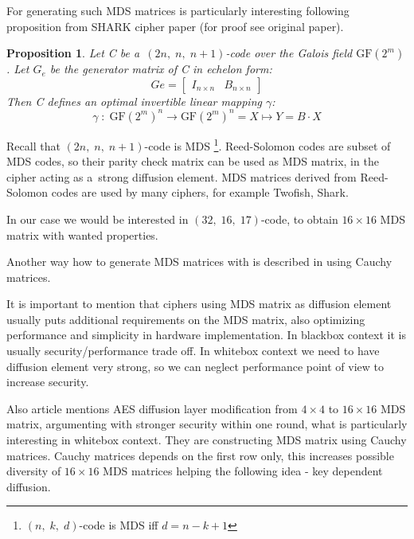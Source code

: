 \documentclass[11pt,oneside,final]{fithesis2}
\newtheorem{myprop}{Proposition}
\begin{document}
    For generating such MDS matrices is particularly interesting following proposition from SHARK cipher paper \citep{shark96} (for proof see
    original paper).
    
    \begin{myprop}
	Let C be a~$(2n,\; n,\; n+1)$-code over the Galois field $\text{GF}(2^m)$. Let $G_e$  be the generator matrix of C in echelon form:
	\begin{equation}
	   Ge = \begin{bmatrix} I_{n \times n} & B_{n \times n}\end{bmatrix}
	\end{equation}
	Then C defines an optimal invertible linear mapping $\gamma$:
	\begin{equation}
	   \gamma \; : \; \text{GF}(2^m)^n \rightarrow \text{GF}(2^m)^n = X \mapsto Y = B \cdot X
	\end{equation}
    \end{myprop}
    
    Recall that $(2n,\; n,\; n+1)$-code is MDS \footnote{$(n,\;k,\;d)$-code is MDS iff $d=n-k+1$}. Reed-Solomon codes are subset of MDS codes, so their 
    parity check matrix can be used as MDS matrix, in the cipher acting as a~strong diffusion element. MDS matrices derived from Reed-Solomon codes are used by many 
    ciphers, for example Twofish, Shark. 

    In our case we would be interested in $(32,\;16,\;17)$-code, to obtain $16 \times 16$ MDS matrix with wanted properties.
    
    Another way how to generate MDS matrices with is described in \citep{Roth:1985:GMM:7030.7044} using Cauchy matrices. 

    It is important to mention that ciphers using MDS matrix as diffusion element usually puts additional requirements on the MDS matrix, also optimizing
    performance and simplicity in hardware implementation. In blackbox context it is usually security/performance trade off. In whitebox context we need
    to have diffusion element very strong, so we can neglect performance point of view to increase security.
    
    Also article \cite{mds_aes} mentions AES diffusion layer modification from $4 \times 4$ to $16 \times 16$ MDS matrix, argumenting with 
    stronger security within one round, what is particularly interesting in whitebox context. They are constructing MDS matrix using Cauchy matrices. Cauchy matrices
    depends on the first row only, this increases possible diversity of $16 \times 16$ MDS matrices helping the following idea - key dependent diffusion.
\end{document}
